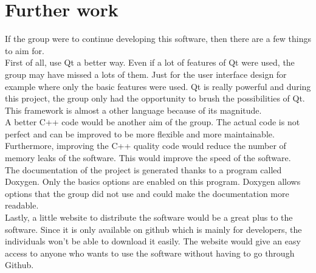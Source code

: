 \chapter{Further work}
If the group were to continue developing this software, then there are a few things to aim for.\\
First of all, use Qt a better way. Even if a lot of features of Qt were used, the group may have missed a lots of them. Just for the user interface design for example where only the basic features were used. Qt is really powerful and during this project, the group only had the opportunity to brush the possibilities of Qt. This framework is almost a other language because of its magnitude.\\
A better C++ code would be another aim of the group. The actual code is not perfect and can be improved to be more flexible and more maintainable. Furthermore, improving the C++ quality code would reduce the number of memory leaks of the software. This would improve the speed of the software.\\
The documentation of the project is generated thanks to a program called Doxygen. Only the basics options are enabled on this program. Doxygen allows options that the group did not use and could make the documentation more readable.\\
Lastly, a little website to distribute the software would be a great plus to the software. Since it is only available on github which is mainly for developers, the individuals won't be able to download it easily. The website would give an easy access to anyone who wants to use the software without having to go through Github.\\
